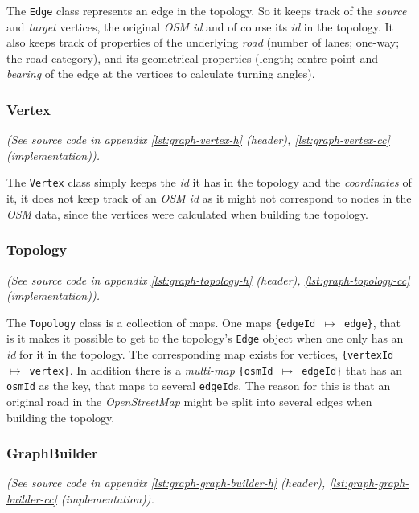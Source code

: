 \documentclass[../main.tex]{subfiles}
\begin{document}
\noindent
The \texttt{Edge} class represents an edge in the topology. So it keeps track of the \textit{source} and \textit{target} vertices, the original \textit{OSM id} and of course its \textit{id} in the topology. It also keeps track of properties of the underlying \textit{road} (number of lanes; one-way; the road category), and its geometrical properties (length; centre point and \textit{bearing} of the edge at the vertices to calculate turning angles).

\subsubsection{Vertex}
\textit{(See source code in appendix \ref{lst:graph-vertex-h} (header), \ref{lst:graph-vertex-cc} (implementation)).}

\noindent
The \texttt{Vertex} class simply keeps the \textit{id} it has in the topology and the \textit{coordinates} of it, it does not keep track of an \textit{OSM id} as it might not correspond to nodes in the \textit{OSM} data, since the vertices were calculated when building the topology.

\subsubsection{Topology}
\textit{(See source code in appendix \ref{lst:graph-topology-h} (header), \ref{lst:graph-topology-cc} (implementation)).}

\noindent
The \texttt{Topology} class is a collection of maps. One maps \texttt{\{edgeId $\mapsto$ edge\}}, that is it makes it possible to get to the topology's \texttt{Edge} object when one only has an \textit{id} for it in the topology. The corresponding map exists for vertices, \texttt{\{vertexId $\mapsto$ vertex\}}. In addition there is a \textit{multi-map} \texttt{\{osmId $\mapsto$ edgeId\}} that has an \texttt{osmId} as the key, that maps to several \texttt{edgeId}s. The reason for this is that an original road in the \textit{OpenStreetMap} might be split into several edges when building the topology.

\subsubsection{GraphBuilder}
\textit{(See source code in appendix \ref{lst:graph-graph-builder-h} (header), \ref{lst:graph-graph-builder-cc} (implementation)).}
\end{document}
